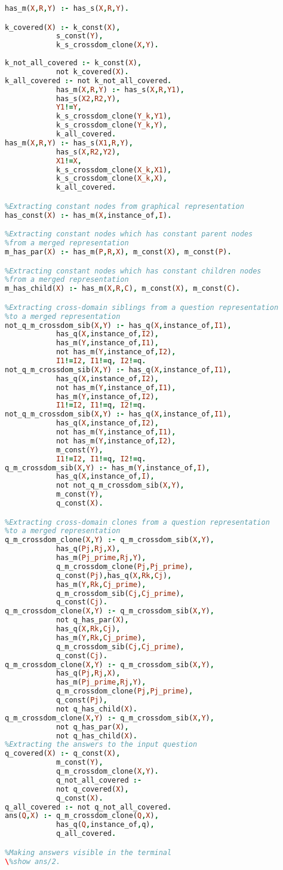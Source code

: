 \begin{lstlisting}[language=Prolog]
%Generating a merged representation of a sentence and a knowledge
has_m(X,R,Y) :- has_s(X,R,Y).

k_covered(X) :- k_const(X),
			s_const(Y),
			k_s_crossdom_clone(X,Y).
			
k_not_all_covered :- k_const(X),
			not k_covered(X).
k_all_covered :- not k_not_all_covered.
			has_m(X,R,Y) :- has_s(X,R,Y1),
			has_s(X2,R2,Y),
			Y1!=Y,
			k_s_crossdom_clone(Y_k,Y1),
			k_s_crossdom_clone(Y_k,Y),
			k_all_covered.
has_m(X,R,Y) :- has_s(X1,R,Y),
			has_s(X,R2,Y2),
			X1!=X,
			k_s_crossdom_clone(X_k,X1),
			k_s_crossdom_clone(X_k,X),
			k_all_covered.

%Extracting constant nodes from graphical representation
has_const(X) :- has_m(X,instance_of,I).

%Extracting constant nodes which has constant parent nodes
%from a merged representation
m_has_par(X) :- has_m(P,R,X), m_const(X), m_const(P).

%Extracting constant nodes which has constant children nodes
%from a merged representation
m_has_child(X) :- has_m(X,R,C), m_const(X), m_const(C).

%Extracting cross-domain siblings from a question representation
%to a merged representation
not_q_m_crossdom_sib(X,Y) :- has_q(X,instance_of,I1),
			has_q(X,instance_of,I2),
			has_m(Y,instance_of,I1),
			not has_m(Y,instance_of,I2),
			I1!=I2, I1!=q, I2!=q.
not_q_m_crossdom_sib(X,Y) :- has_q(X,instance_of,I1),
			has_q(X,instance_of,I2),
			not has_m(Y,instance_of,I1),
			has_m(Y,instance_of,I2),
			I1!=I2, I1!=q, I2!=q.
not_q_m_crossdom_sib(X,Y) :- has_q(X,instance_of,I1),
			has_q(X,instance_of,I2),
			not has_m(Y,instance_of,I1),
			not has_m(Y,instance_of,I2),
			m_const(Y),
			I1!=I2, I1!=q, I2!=q.
q_m_crossdom_sib(X,Y) :- has_m(Y,instance_of,I),
			has_q(X,instance_of,I),
			not not_q_m_crossdom_sib(X,Y),
			m_const(Y),
			q_const(X).

%Extracting cross-domain clones from a question representation
%to a merged representation
q_m_crossdom_clone(X,Y) :- q_m_crossdom_sib(X,Y),
			has_q(Pj,Rj,X),
			has_m(Pj_prime,Rj,Y),
			q_m_crossdom_clone(Pj,Pj_prime),
			q_const(Pj),has_q(X,Rk,Cj),
			has_m(Y,Rk,Cj_prime),
			q_m_crossdom_sib(Cj,Cj_prime),
			q_const(Cj).
q_m_crossdom_clone(X,Y) :- q_m_crossdom_sib(X,Y),
			not q_has_par(X),
			has_q(X,Rk,Cj),
			has_m(Y,Rk,Cj_prime),
			q_m_crossdom_sib(Cj,Cj_prime),
			q_const(Cj).
q_m_crossdom_clone(X,Y) :- q_m_crossdom_sib(X,Y),
			has_q(Pj,Rj,X),
			has_m(Pj_prime,Rj,Y),
			q_m_crossdom_clone(Pj,Pj_prime),
			q_const(Pj),
			not q_has_child(X).
q_m_crossdom_clone(X,Y) :- q_m_crossdom_sib(X,Y),
			not q_has_par(X),
			not q_has_child(X).
%Extracting the answers to the input question
q_covered(X) :- q_const(X),
			m_const(Y),
			q_m_crossdom_clone(X,Y).
			q_not_all_covered :-
			not q_covered(X),
			q_const(X).
q_all_covered :- not q_not_all_covered.
ans(Q,X) :- q_m_crossdom_clone(Q,X),
			has_q(Q,instance_of,q),
			q_all_covered.

%Making answers visible in the terminal
\%show ans/2.



\end{lstlisting}